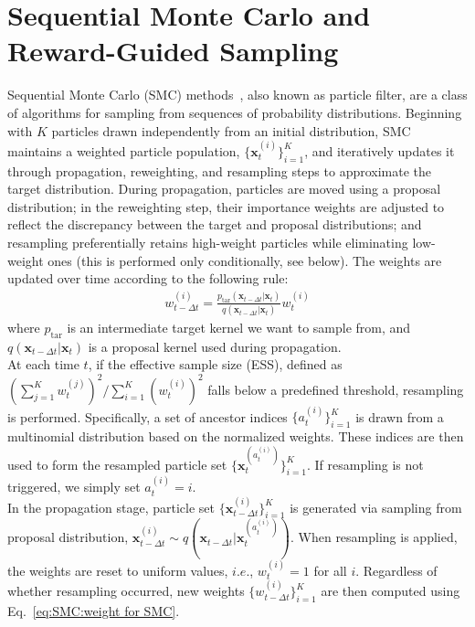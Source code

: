 \section{Sequential Monte Carlo and Reward-Guided Sampling}
\label{sec:appx:smc}
Sequential Monte Carlo (SMC) methods~\cite{doucet2001sequential, del2006sequential, chopin2020introduction}, also known as particle filter, are a class of algorithms for sampling from sequences of probability distributions.
Beginning with $K$ particles drawn independently from an initial distribution, SMC maintains a weighted particle population, $\{\mathbf{x}^{(i)}_t\}_{i=1}^K$, and iteratively updates it through propagation, reweighting, and resampling steps to approximate the target distribution.
During propagation, particles are moved using a proposal distribution; in the reweighting step, their importance weights are adjusted to reflect the discrepancy between the target and proposal distributions; and resampling preferentially retains high-weight particles while eliminating low-weight ones (this is performed only conditionally, see below). 
The weights are updated over time according to the following rule:
\begin{align}
    \label{eq:SMC:weight for SMC}
    w_{t-\Delta t}^{(i)}=\frac{p_{\text{tar}}(\mathbf{x}_{t-\Delta t}|\mathbf{x}_{t})}{q(\mathbf{x}_{t-\Delta t}|\mathbf{x}_{t})}w_t^{(i)}
\end{align}
where $p_{\text{tar}}$ is an intermediate target kernel we want to sample from, and $q(\mathbf{x}_{t-\Delta t}|\mathbf{x}_{t})$ is a proposal kernel used during propagation. \\
At each time $t$, if the effective sample size (ESS), defined as $\left(\sum_{j=1}^K w_t^{(j)} \right)^2/\sum_{i=1}^K \left(w_t^{(i)}\right)^2$ falls below a predefined threshold, resampling is performed. Specifically, a set of ancestor indices $\{ a_t^{(i)} \}_{i=1}^{K}$ is drawn from a multinomial distribution based on the normalized weights. These indices are then used to form the resampled particle set $\{ \mathbf{x}_{t}^{ ( a_t^{(i)} ) } \}_{i=1}^K$. If resampling is not triggered, we simply set $a_t^{(i)}=i$. \\
In the propagation stage, particle set $\{\mathbf{x}^{(i)}_{t-\Delta t}\}_{i=1}^K$ is generated via sampling from proposal distribution, $\mathbf{x}^{(i)}_{t-\Delta t} \sim q(\mathbf{x}_{t-\Delta t}|\mathbf{x}_t^{(a_t^{(i)})})$.
When resampling is applied, the weights are reset to uniform values, $i.e.$, $w_t^{(i)}=1$ for all $i$. Regardless of whether resampling occurred, new weights $\{w^{(i)}_{t-\Delta t}\}_{i=1}^K$ are then computed using Eq.~\ref{eq:SMC:weight for SMC}. \\
